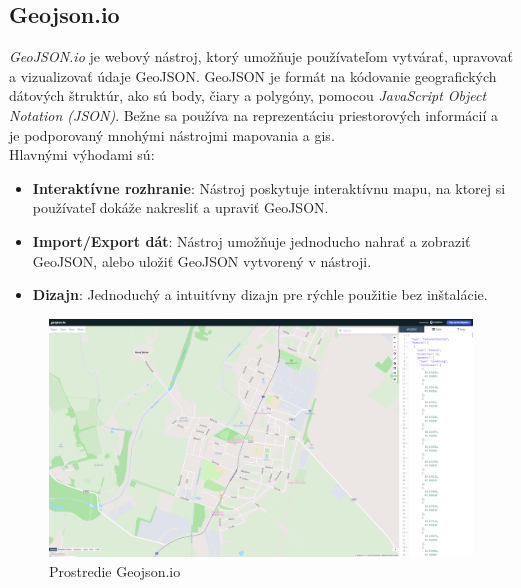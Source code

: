 \subsection{Geojson.io}
\indent \indent \textit{GeoJSON.io} je webový nástroj, ktorý umožňuje používateľom vytvárať, upravovať a vizualizovať údaje GeoJSON. GeoJSON je formát na kódovanie geografických dátových štruktúr, ako sú body, čiary a polygóny, pomocou \textit{JavaScript Object Notation (JSON)}. Bežne sa používa na reprezentáciu priestorových informácií a je podporovaný mnohými nástrojmi mapovania a \acrshort{gis}. \\ Hlavnými výhodami sú:
\begin{itemize}
    \item \textbf{Interaktívne rozhranie}: Nástroj poskytuje interaktívnu mapu, na ktorej si používateľ dokáže nakresliť a upraviť GeoJSON.
    \item \textbf{Import/Export dát}: Nástroj umožňuje jednoducho nahrať a zobraziť GeoJSON, alebo uložiť GeoJSON vytvorený v nástroji.
    \item \textbf{Dizajn}: Jednoduchý a intuitívny dizajn pre rýchle použitie bez inštalácie.
\end{itemize}
\begin{figure}[H]
    \centering
    \includegraphics[width = \linewidth]{img/geojson.png}
    \caption{Prostredie Geojson.io}
\end{figure}
